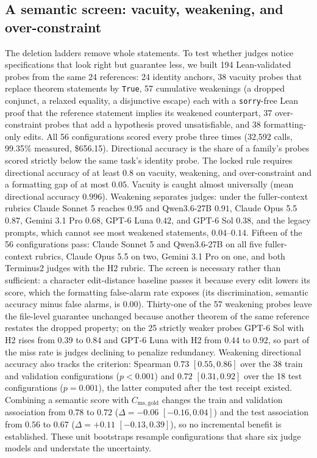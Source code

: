 \subsection{A semantic screen: vacuity, weakening, and over-constraint}\label{sec:semantic-screen}
The deletion ladders remove whole statements.
To test whether judges notice specifications that look right but guarantee less, we built 194 Lean-validated probes from the same 24 references: 24 identity anchors, 38 vacuity probes that replace theorem statements by \texttt{True}, 57 cumulative weakenings (a dropped conjunct, a relaxed equality, a disjunctive escape) each with a \texttt{sorry}-free Lean proof that the reference statement implies its weakened counterpart, 37 over-constraint probes that add a hypothesis proved unsatisfiable, and 38 formatting-only edits.
All 56 configurations scored every probe three times (32{,}592 calls, 99.35\% measured, \$656.15).
Directional accuracy is the share of a family's probes scored strictly below the same task's identity probe.
The locked rule requires directional accuracy of at least $0.8$ on vacuity, weakening, and over-constraint and a formatting gap of at most $0.05$.
Vacuity is caught almost universally (mean directional accuracy $0.996$).
Weakening separates judges: under the fuller-context rubrics Claude Sonnet 5 reaches $0.95$ and Qwen3.6-27B $0.91$, Claude Opus 5.5 $0.87$, Gemini 3.1 Pro $0.68$, GPT-6 Luna $0.42$, and GPT-6 Sol $0.38$, and the legacy prompts, which cannot see most weakened statements, $0.04$--$0.14$.
Fifteen of the 56 configurations pass: Claude Sonnet 5 and Qwen3.6-27B on all five fuller-context rubrics, Claude Opus 5.5 on two, Gemini 3.1 Pro on one, and both Terminus2 judges with the H2 rubric.
The screen is necessary rather than sufficient: a character edit-distance baseline passes it because every edit lowers its score, which the formatting false-alarm rate exposes (its discrimination, semantic accuracy minus false alarms, is $0.00$).
Thirty-one of the 57 weakening probes leave the file-level guarantee unchanged because another theorem of the same reference restates the dropped property; on the 25 strictly weaker probes GPT-6 Sol with H2 rises from $0.39$ to $0.84$ and GPT-6 Luna with H2 from $0.44$ to $0.92$, so part of the miss rate is judges declining to penalize redundancy.
Weakening directional accuracy also tracks the criterion: Spearman $0.73$ $[0.55, 0.86]$ over the 38 train and validation configurations ($p < 0.001$) and $0.72$ $[0.31, 0.92]$ over the 18 test configurations ($p = 0.001$), the latter computed after the test receipt existed.
Combining a semantic score with $C_{\mathrm{ms,gold}}$ changes the train and validation association from $0.78$ to $0.72$ ($\Delta = -0.06$ $[-0.16, 0.04]$) and the test association from $0.56$ to $0.67$ ($\Delta = +0.11$ $[-0.13, 0.39]$), so no incremental benefit is established.
These unit bootstraps resample configurations that share six judge models and understate the uncertainty.

